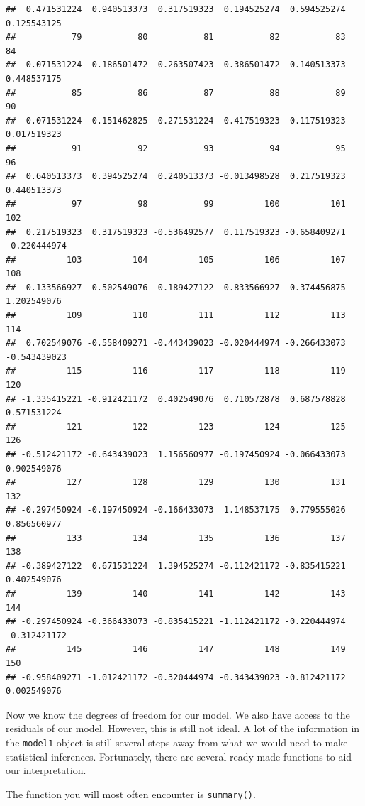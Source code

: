 \documentclass[
]{book}
\begin{document}
\begin{verbatim}
##  0.471531224  0.940513373  0.317519323  0.194525274  0.594525274  0.125543125 
##           79           80           81           82           83           84 
##  0.071531224  0.186501472  0.263507423  0.386501472  0.140513373  0.448537175 
##           85           86           87           88           89           90 
##  0.071531224 -0.151462825  0.271531224  0.417519323  0.117519323  0.017519323 
##           91           92           93           94           95           96 
##  0.640513373  0.394525274  0.240513373 -0.013498528  0.217519323  0.440513373 
##           97           98           99          100          101          102 
##  0.217519323  0.317519323 -0.536492577  0.117519323 -0.658409271 -0.220444974 
##          103          104          105          106          107          108 
##  0.133566927  0.502549076 -0.189427122  0.833566927 -0.374456875  1.202549076 
##          109          110          111          112          113          114 
##  0.702549076 -0.558409271 -0.443439023 -0.020444974 -0.266433073 -0.543439023 
##          115          116          117          118          119          120 
## -1.335415221 -0.912421172  0.402549076  0.710572878  0.687578828  0.571531224 
##          121          122          123          124          125          126 
## -0.512421172 -0.643439023  1.156560977 -0.197450924 -0.066433073  0.902549076 
##          127          128          129          130          131          132 
## -0.297450924 -0.197450924 -0.166433073  1.148537175  0.779555026  0.856560977 
##          133          134          135          136          137          138 
## -0.389427122  0.671531224  1.394525274 -0.112421172 -0.835415221  0.402549076 
##          139          140          141          142          143          144 
## -0.297450924 -0.366433073 -0.835415221 -1.112421172 -0.220444974 -0.312421172 
##          145          146          147          148          149          150 
## -0.958409271 -1.012421172 -0.320444974 -0.343439023 -0.812421172  0.002549076
\end{verbatim}

Now we know the degrees of freedom for our model. We also have access to the residuals of our model. However, this is still not ideal. A lot of the information in the \texttt{model1} object is still several steps away from what we would need to make statistical inferences. Fortunately, there are several ready-made functions to aid our interpretation.

The function you will most often encounter is \texttt{summary()}.
\end{document}
